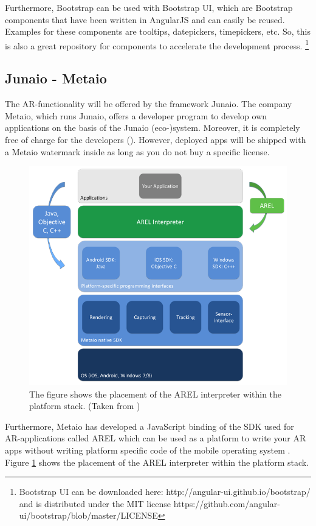 Furthermore, Bootstrap can be used with Bootstrap UI, which are Bootstrap components that have been written in AngularJS and can easily be reused. Examples for these components are tooltips, datepickers, timepickers, etc. So, this is also a great repository for components to accelerate the development process. \footnote{Bootstrap UI can be downloaded here: http://angular-ui.github.io/bootstrap/ and is distributed under the MIT license https://github.com/angular-ui/bootstrap/blob/master/LICENSE}

\subsection{Junaio - Metaio}
\label{AREL}
The \ac{AR}-functionality will be offered by the framework Junaio. The company Metaio, which runs Junaio, offers a developer program to develop own applications on the basis of the Junaio (eco-)system. Moreover, it is completely free of charge for the developers (\cite{junaio1}). However, deployed apps will be shipped with a Metaio watermark inside as long as you do not buy a specific license. 

\begin{figure}[th]
\centerline{\includegraphics[width=.7\textwidth]{gfx/stackAREL}}
\caption{The figure shows the placement of the AREL interpreter within the platform stack. (Taken from \cite{MetaioDEV})}
\label{stackArel}
\end{figure}

Furthermore, Metaio has developed a JavaScript binding of the SDK used for \ac{AR}-applications called \ac{AREL} which can be used as a platform to write your \ac{AR} apps without writing platform specific code of the mobile operating system \cite{MetaioDEV}. Figure \ref{stackArel} shows the placement of the \ac{AREL} interpreter within the platform stack. 

